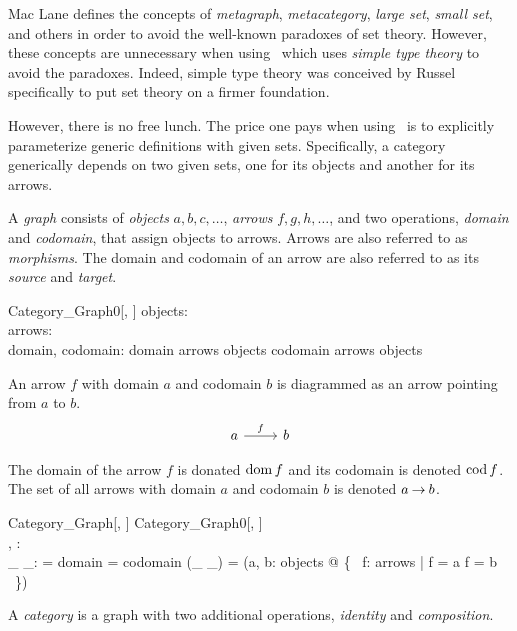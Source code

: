\documentclass{amsart}
\begin{document}
Mac Lane\cite{maclane-cftwm} defines the concepts of \textit{metagraph}, \textit{metacategory}, \textit{large set},  \textit{small set}, and others 
in order to avoid the well-known paradoxes of set theory.
However, these concepts are unnecessary when using \ZN\ which uses \textit{simple type theory} to avoid the paradoxes.
Indeed, simple type theory was conceived by Russel specifically to put set theory on a firmer foundation.

However, there is no free lunch.
The price one pays when using \ZN\ is to explicitly parameterize generic definitions with given sets.
Specifically, a category generically depends on two given sets, one for its objects and another for its arrows.

A \textit{graph} consists of \textit{objects} $a, b, c, \dots$, \textit{arrows} $f, g, h, \dots$, 
and two operations, \textit{domain} and \textit{codomain}, that assign objects to arrows.
Arrows are also referred to as \textit{morphisms}.
The domain and codomain of an arrow are also referred to as its \textit{source} and \textit{target}.
\begin{schema}{Category\_Graph0}[\genO, \genA]
	objects: \power \genO \\
	arrows: \power \genA \\
	domain, codomain: \genA \pfun \genO
\where
	domain \in arrows \fun objects
\also
	codomain \in arrows \fun objects
\end{schema}

An arrow $f$ with domain $a$ and codomain $b$ is diagrammed as an arrow pointing from $a$ to $b$.
$$
 \begin{tikzcd}
	a \arrow{r}{f} & b 
\end{tikzcd}
$$

The domain of the arrow $f$ is donated $\operatorname{dom} f$ and its codomain is denoted $\operatorname{cod} f$.
The set of all arrows with domain $a$ and codomain $b$ is denoted $a \mathbin{\rightarrow} b$.

\begin{schema}{Category\_Graph}[\genO, \genA]
	Category\_Graph0[\genO, \genA] \\
	\domCat, \codCat: \genA \pfun \genO \\
	\_ \arrCat \_: \genO \cross \genO \pfun \power \genA
\where
	\domCat = domain
\also
	\codCat = codomain
\also
	(\_ \arrCat \_) = (\lambda a, b: objects @ \{~ f: arrows | \domCat f = a \land \codCat f = b ~\})
\end{schema}

A \textit{category} is a graph with two additional operations, \textit{identity} and \textit{composition}.
\end{document}
